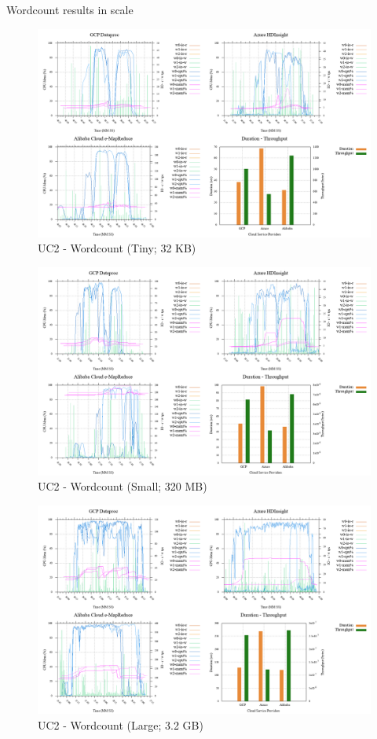 \documentclass[review]{elsarticle}
\begin{document}
Wordcount results in scale

\begin{figure}[b]
	\caption{UC2 - Wordcount (Tiny; 32 KB)}
	\includegraphics[width=\textwidth]{uc2-wrdcnt-t-cmidt}
	\centering
\end{figure}

\begin{figure}[b]
	\caption{UC2 - Wordcount (Small; 320 MB)}
	\includegraphics[width=\textwidth]{uc2-wrdcnt-s-cmidt}
	\centering
\end{figure}

\begin{figure}[b]
	\caption{UC2 - Wordcount (Large; 3.2 GB)}
	\includegraphics[width=\textwidth]{uc2-wrdcnt-l-cmidt}
	\centering
\end{figure}
\end{document}

